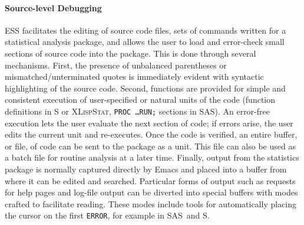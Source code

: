 \documentclass{article}
\newcommand*{\SAS}{\textsc{SAS}}
\newcommand*{\XLispStat}{\textsc{XLispStat}}
\newcommand{\stexttt}[1]{{\small\texttt{#1}}}
\begin{document}
\paragraph{Source-level Debugging}
ESS facilitates the editing of source code files, sets of 
commands written for a statistical analysis package, and allows the
user to load and error-check small sections of source
code into the package.  This is done through several mechanisms.
First, the presence of
unbalanced parentheses or mismatched/unterminated quotes is immediately 
evident with syntactic highlighting of the source code.  Second,
functions are provided for simple and consistent execution of
user-specified or natural units of the code (function definitions in S
or \XLispStat, \stexttt{PROC \dots  RUN;} sections in \SAS).
An error-free execution lets the user evaluate the next
section of code; if errors arise, the user edits the current unit
and re-executes.
Once the code is verified, an entire buffer, or file, of code can be
sent to the package as a unit.  This file can also be used as a batch
file for routine analysis at a later time.  Finally, output from the
statistics package is normally captured directly by Emacs and placed into a buffer from where
it can be edited and searched.  Particular forms of output such as
requests for help pages and log-file output can be diverted into
special buffers with modes crafted to facilitate reading.  These modes
include tools for
automatically placing the cursor on the first \stexttt{ERROR},
for example in \SAS\ and S.
\end{document}
